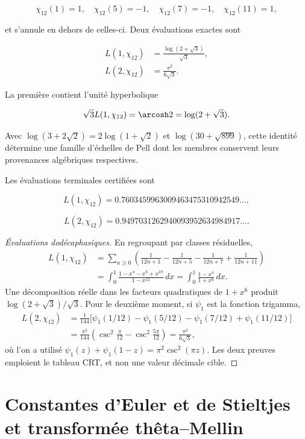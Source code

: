 \[
\chi_{12}(1)=1,\quad
\chi_{12}(5)=-1,\quad
\chi_{12}(7)=-1,\quad
\chi_{12}(11)=1,
\]

et s'annule en dehors de celles-ci. Deux évaluations exactes sont

\begin{align}
L(1,\chi_{12})&=\frac{\log(2+\sqrt3)}{\sqrt3},
\label{eq:L1chi12}\\
L(2,\chi_{12})&=\frac{\pi^2}{6\sqrt3}.
\label{eq:L2chi12}
\end{align}

La première contient l'unité hyperbolique

\begin{equation}
\sqrt3L(1,\chi_{12})=\arcosh2=\log(2+\sqrt3).
\label{eq:pell2}
\end{equation}

Avec \(\log(3+2\sqrt2)=2\log(1+\sqrt2)\) et
\(\log(30+\sqrt{899})\), cette identité détermine une famille d'échelles
de Pell dont les membres conservent leurs provenances algébriques respectives.

Les évaluations terminales certifiées sont

\[
L(1,\chi_{12})=0.7603459963009463475310942549\ldots,
\]

\[
L(2,\chi_{12})=0.9497031262940093952634984917\ldots.
\]

\begin{proof}[Évaluations dodécaphasiques]
En regroupant par classes résiduelles,
\begin{align*}
L(1,\chi_{12})
&=\sum_{n\ge0}\left(
\frac1{12n+1}-\frac1{12n+5}
-\frac1{12n+7}+\frac1{12n+11}\right)\\
&=\int_0^1
\frac{1-x^4-x^6+x^{10}}{1-x^{12}}\,dx
=\int_0^1\frac{1-x^4}{1+x^6}\,dx.
\end{align*}
Une décomposition réelle dans les facteurs quadratiques de \(1+x^6\)
produit
\(\log(2+\sqrt3)/\sqrt3\). Pour le deuxième moment, si
\(\psi_1\) est la fonction trigamma,
\begin{align*}
L(2,\chi_{12})
&=\frac1{144}\bigl[
\psi_1(1/12)-\psi_1(5/12)
-\psi_1(7/12)+\psi_1(11/12)\bigr]\\
&=\frac{\pi^2}{144}\left(
\csc^2\frac\pi{12}-\csc^2\frac{5\pi}{12}\right)
=\frac{\pi^2}{6\sqrt3},
\end{align*}
où l'on a utilisé
\(\psi_1(z)+\psi_1(1-z)=\pi^2\csc^2(\pi z)\). Les deux preuves emploient
le tableau CRT, et non une valeur décimale cible.
\end{proof}

\section{Constantes d'Euler et de Stieltjes et transformée thêta--Mellin}

